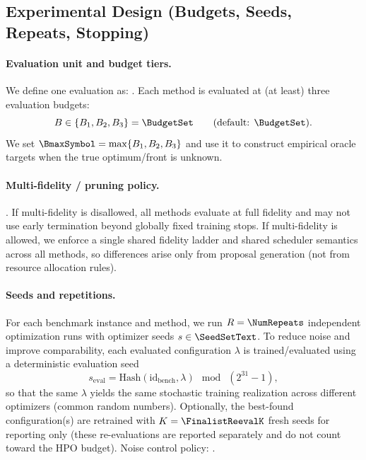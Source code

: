 \subsection{Experimental Design (Budgets, Seeds, Repeats, Stopping)}
\label{subsec:design}

\paragraph{Evaluation unit and budget tiers.}
We define one evaluation as: \EvaluationUnit{}.
Each method is evaluated at (at least) three evaluation budgets:
\begin{equation}
    B \in \{B_1,B_2,B_3\} = \BudgetSet
    \qquad
    \text{(default: \(\BudgetSet\)).}
\end{equation}
We set \(\BmaxSymbol = \max\{B_1,B_2,B_3\}\) and use it to construct empirical oracle targets when the true optimum/front is unknown.

\paragraph{Multi-fidelity / pruning policy.}
\MultiFidelityPolicy{}.
If multi-fidelity is disallowed, all methods evaluate at full fidelity and may not use early termination beyond globally fixed training stops.
If multi-fidelity is allowed, we enforce a single shared fidelity ladder and shared scheduler semantics across all methods,
so differences arise only from proposal generation (not from resource allocation rules).

\paragraph{Seeds and repetitions.}
For each benchmark instance and method, we run \(R=\NumRepeats\) independent optimization runs with optimizer seeds \(s \in \SeedSetText\).
To reduce noise and improve comparability, each evaluated configuration \(\lambda\) is trained/evaluated using a deterministic evaluation seed
\begin{equation}
    s_{\mathrm{eval}} = \mathrm{Hash}(\mathrm{id}_{\mathrm{bench}}, \lambda)\ \bmod\ (2^{31}-1),
\end{equation}
so that the same \(\lambda\) yields the same stochastic training realization across different optimizers (common random numbers).
Optionally, the best-found configuration(s) are retrained with \(K=\FinalistReevalK\) fresh seeds for reporting only
(these re-evaluations are reported separately and do not count toward the HPO budget).
Noise control policy: \NoiseControlPolicy{}.


